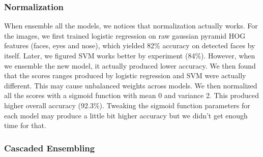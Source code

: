 \subsubsection{Normalization}
When ensemble all the models, we notices that normalization actually works. For the images, we first trained logistic regression on raw gaussian pyramid HOG features (faces, eyes and nose), which yielded 82\% accuracy on detected faces by itself. Later, we figured SVM works better by experiment (84\%). However, when we ensemble the new model, it actually produced lower accuracy. We then found that the scores ranges produced by logistic regression and SVM were actually different. This may cause unbalanced weights across models. We then normalized all the scores with a sigmoid function with mean 0 and variance 2. This produced higher overall accuracy (92.3\%). Tweaking the sigmoid function parameters for each model may produce a little bit higher accuracy but we didn't get enough time for that.
\subsubsection{Cascaded Ensembling}


